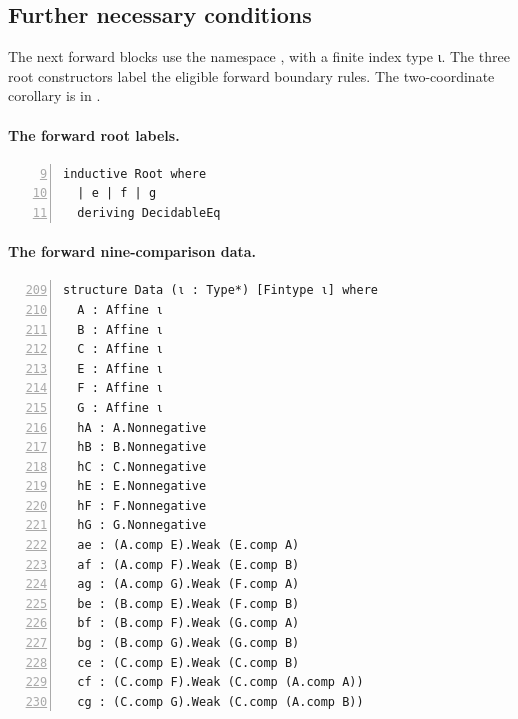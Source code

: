 \documentclass[11pt,a4paper]{article}
\begin{document}

\subsection*{Further necessary conditions}

The next forward blocks use the namespace
, with a finite index type
{\leanappendixfont ι}. The three root constructors label the eligible forward
boundary rules. The two-coordinate corollary is in
.

\paragraph{The forward root labels.}\mbox{}\par
{}\par
\begin{Verbatim}[formatcom=\leanappendixfont,fontsize=\scriptsize,numbers=left,firstnumber=9,numbersep=5pt,xleftmargin=18pt]
inductive Root where
  | e | f | g
  deriving DecidableEq
\end{Verbatim}

\paragraph{The forward nine-comparison data.}\mbox{}\par
{}\par
\begin{Verbatim}[formatcom=\leanappendixfont,fontsize=\scriptsize,numbers=left,firstnumber=209,numbersep=5pt,xleftmargin=18pt]
structure Data (ι : Type*) [Fintype ι] where
  A : Affine ι
  B : Affine ι
  C : Affine ι
  E : Affine ι
  F : Affine ι
  G : Affine ι
  hA : A.Nonnegative
  hB : B.Nonnegative
  hC : C.Nonnegative
  hE : E.Nonnegative
  hF : F.Nonnegative
  hG : G.Nonnegative
  ae : (A.comp E).Weak (E.comp A)
  af : (A.comp F).Weak (E.comp B)
  ag : (A.comp G).Weak (F.comp A)
  be : (B.comp E).Weak (F.comp B)
  bf : (B.comp F).Weak (G.comp A)
  bg : (B.comp G).Weak (G.comp B)
  ce : (C.comp E).Weak (C.comp B)
  cf : (C.comp F).Weak (C.comp (A.comp A))
  cg : (C.comp G).Weak (C.comp (A.comp B))
\end{Verbatim}
\end{document}
